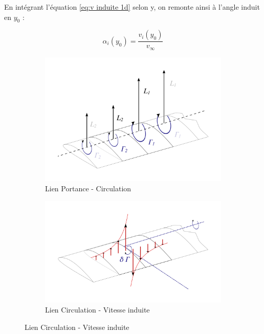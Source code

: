 En intégrant l'équation \ref{eq:v induite 1d} selon y, on remonte ainsi à l'angle induit en $y_0$ : 
\begin{center}
    \begin{equation}
        \alpha_i(y_0) = \frac{v_i(y_0)}{v_{\infty}}
        \label{eq:angle induit}
    \end{equation}
\end{center}

\begin{figure}[H]
    \centering
    \begin{subfigure}[b]{0.45\textwidth}
        \centering
        \includegraphics[width=\textwidth]{Pics/01 - Basses Fidélités/LLT KJ.png}
        \caption{Lien Portance - Circulation}
        \label{fig:LLT KJ}
    \end{subfigure}
    \hfill
    \begin{subfigure}[b]{0.45\textwidth}
        \centering
        \includegraphics[width=\textwidth]{Pics/01 - Basses Fidélités/LLT vortex.png}
        \caption{Lien Circulation - Vitesse induite}
        \label{fig:LLT vortex}
    \end{subfigure}
\end{figure}

